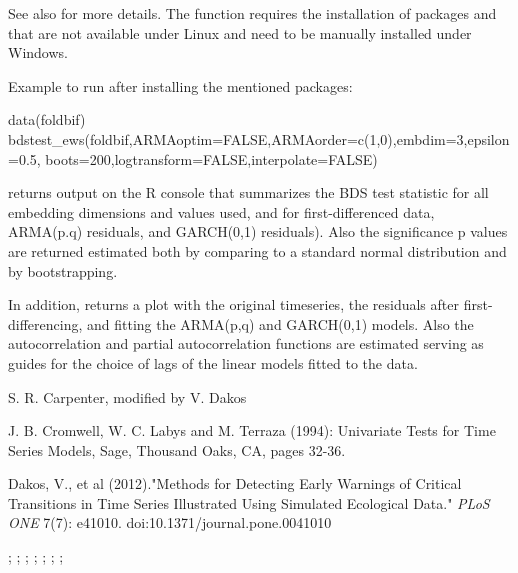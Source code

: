 \documentclass[a4paper]{book}
\begin{document}
%
\begin{Details}\relax
See also  for more details. The
function requires the installation of packages
 and  that are not available
under Linux and need to be manually installed under
Windows.

Example to run after installing the mentioned packages:

data(foldbif)
bdstest\_ews(foldbif,ARMAoptim=FALSE,ARMAorder=c(1,0),embdim=3,epsilon=0.5,
boots=200,logtransform=FALSE,interpolate=FALSE)
\end{Details}
%
\begin{Value}
 returns output on the R console that
summarizes the BDS test statistic for all embedding
dimensions and  values used, and for
first-differenced data, ARMA(p.q) residuals, and
GARCH(0,1) residuals). Also the significance p values are
returned estimated both by comparing to a standard normal
distribution and by bootstrapping.

In addition,  returns a plot with the
original timeseries, the residuals after
first-differencing, and fitting the ARMA(p,q) and
GARCH(0,1) models. Also the autocorrelation
 and partial autocorrelation
 functions are estimated serving as
guides for the choice of lags of the linear models fitted
to the data.
\end{Value}
%
\begin{Author}\relax
S. R. Carpenter, modified by V. Dakos
\end{Author}
%
\begin{References}\relax
J. B. Cromwell, W. C. Labys and M. Terraza (1994):
Univariate Tests for Time Series Models, Sage, Thousand
Oaks, CA, pages 32-36.

Dakos, V., et al (2012)."Methods for Detecting Early
Warnings of Critical Transitions in Time Series
Illustrated Using Simulated Ecological Data." \emph{PLoS
ONE} 7(7): e41010. doi:10.1371/journal.pone.0041010
\end{References}
%
\begin{SeeAlso}\relax
{}; ;
; ;
; ;
;
\end{SeeAlso}
\end{document}
